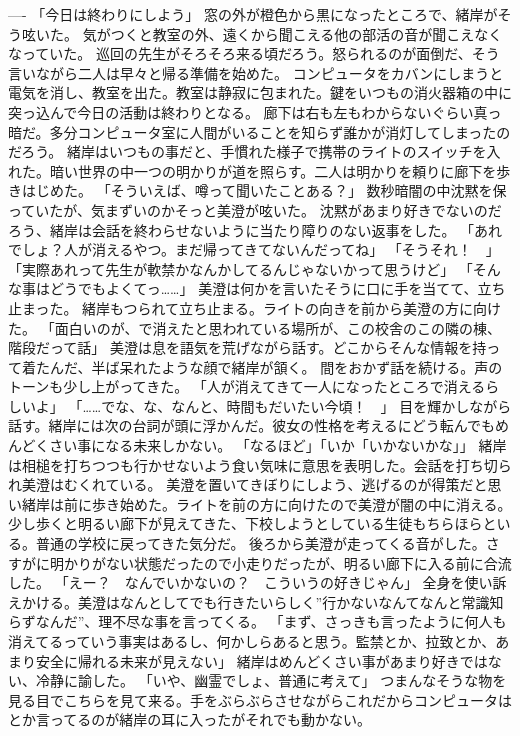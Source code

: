\documentclass[uplatex]{utbook}
\begin{document}
----
「今日は終わりにしよう」
窓の外が橙色から黒になったところで、緒岸がそう呟いた。
気がつくと教室の外、遠くから聞こえる他の部活の音が聞こえなくなっていた。
巡回の先生がそろそろ来る頃だろう。怒られるのが面倒だ、そう言いながら二人は早々と帰る準備を始めた。
コンピュータをカバンにしまうと電気を消し、教室を出た。教室は静寂に包まれた。鍵をいつもの消火器箱の中に突っ込んで今日の活動は終わりとなる。
廊下は右も左もわからないぐらい真っ暗だ。多分コンピュータ室に人間がいることを知らず誰かが消灯してしまったのだろう。
緒岸はいつもの事だと、手慣れた様子で携帯のライトのスイッチを入れた。暗い世界の中一つの明かりが道を照らす。二人は明かりを頼りに廊下を歩きはじめた。
「そういえば、噂って聞いたことある？」
数秒暗闇の中沈黙を保っていたが、気まずいのかそっと美澄が呟いた。
沈黙があまり好きでないのだろう、緒岸は会話を終わらせないように当たり障りのない返事をした。
「あれでしょ？人が消えるやつ。まだ帰ってきてないんだってね」
「そうそれ！　」
「実際あれって先生が軟禁かなんかしてるんじゃないかって思うけど」
「そんな事はどうでもよくてっ……」
美澄は何かを言いたそうに口に手を当てて、立ち止まった。
緒岸もつられて立ち止まる。ライトの向きを前から美澄の方に向けた。
「面白いのが、で消えたと思われている場所が、この校舎のこの隣の棟、階段だって話」
美澄は息を語気を荒げながら話す。どこからそんな情報を持って着たんだ、半ば呆れたような顔で緒岸が頷く。
間をおかず話を続ける。声のトーンも少し上がってきた。
「人が消えてきて一人になったところで消えるらしいよ」
「……でな、な、なんと、時間もだいたい今頃！　」
目を輝かしながら話す。緒岸には次の台詞が頭に浮かんだ。彼女の性格を考えるにどう転んでもめんどくさい事になる未来しかない。
「なるほど」「いか「いかないかな」」
緒岸は相槌を打ちつつも行かせないよう食い気味に意思を表明した。会話を打ち切られ美澄はむくれている。
美澄を置いてきぼりにしよう、逃げるのが得策だと思い緒岸は前に歩き始めた。ライトを前の方に向けたので美澄が闇の中に消える。
少し歩くと明るい廊下が見えてきた、下校しようとしている生徒もちらほらといる。普通の学校に戻ってきた気分だ。
後ろから美澄が走ってくる音がした。さすがに明かりがない状態だったので小走りだったが、明るい廊下に入る前に合流した。
「えー？　なんでいかないの？　こういうの好きじゃん」
全身を使い訴えかける。美澄はなんとしてでも行きたいらしく”行かないなんてなんと常識知らずなんだ”、理不尽な事を言ってくる。
「まず、さっきも言ったように何人も消えてるっていう事実はあるし、何かしらあると思う。監禁とか、拉致とか、あまり安全に帰れる未来が見えない」
緒岸はめんどくさい事があまり好きではない、冷静に諭した。
「いや、幽霊でしょ、普通に考えて」
つまんなそうな物を見る目でこちらを見て来る。手をぶらぶらさせながらこれだからコンピュータはとか言ってるのが緒岸の耳に入ったがそれでも動かない。
\end{document}
